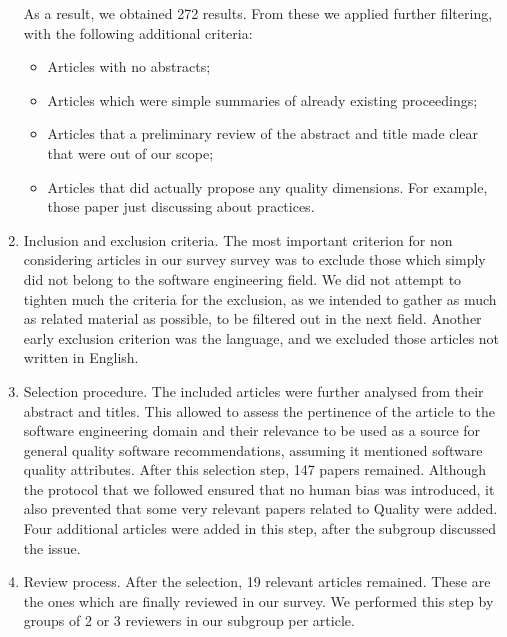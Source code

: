 \begin{enumerate}
    As a result, we obtained 272 results. From these we applied further filtering, with the following additional criteria:
    \begin{itemize}
        \item Articles with no abstracts;
        \item Articles which were simple summaries of already existing proceedings;
        \item Articles that a preliminary review of the abstract and title made clear that were out of our scope;
        \item Articles that did actually propose any quality dimensions. For example, those paper just discussing about practices.
    \end{itemize}

    \item Inclusion and exclusion criteria. The most important criterion for non considering articles in our survey survey was to exclude those which simply did not belong to the software engineering field. We did not attempt to tighten much the criteria for the exclusion, as we intended to gather as much as related material as possible, to be filtered out in the next field. Another early exclusion criterion was the language, and we excluded those articles not written in English.
    \item Selection procedure. The included articles were further analysed from their abstract and titles. This allowed to assess the pertinence of the article to the software engineering domain and their relevance to be used as a source for general quality software recommendations, assuming it mentioned software quality attributes. After this selection step, 147 papers remained. Although the protocol that we followed ensured that no human bias was introduced, it also prevented that some very relevant papers related to Quality were added. Four additional articles were added in this step, after the subgroup discussed the issue. 
    \item Review process. After the selection, 19 relevant articles remained. These are the ones which are finally reviewed in our survey. We performed this step by groups of 2 or 3 reviewers in our subgroup per article. %
\end{enumerate}

